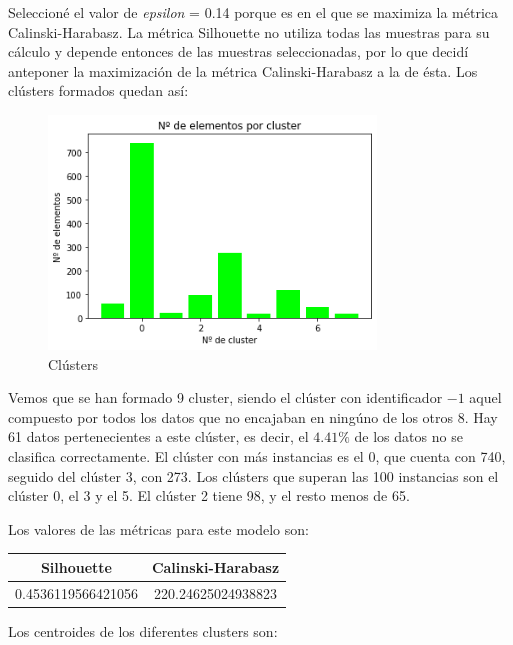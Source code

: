 \documentclass[a4]{article}
\begin{document}
Seleccioné el valor de \textit{epsilon} = 0.14 porque es en el que se maximiza la métrica Calinski-Harabasz. La métrica Silhouette no utiliza todas las muestras para su cálculo y depende entonces de las muestras seleccionadas, por lo que decidí anteponer la maximización de la métrica Calinski-Harabasz a la de ésta. Los clústers formados quedan así:

\begin{figure}[H]
  \centering
  \caption{Clústers}
  \includegraphics[width=87mm]{imagenes/c2_dbscan_clusters}
\end{figure}

Vemos que se han formado 9 cluster, siendo el clúster con identificador $-1$ aquel compuesto por todos los datos que no encajaban en ningúno de los otros 8. Hay 61 datos pertenecientes a este clúster, es decir, el $4.41\%$ de los datos no se clasifica correctamente. El clúster con más instancias es el 0, que cuenta con 740, seguido del clúster 3, con 273. Los clústers que superan las 100 instancias son el clúster 0, el 3 y el 5. El clúster 2 tiene 98, y el resto menos de 65. 

Los valores de las métricas para este modelo son:

\begin{center}
\begin{tabular}{|c|c|}
\hline
\multicolumn{1}{|c|}{\textbf{Silhouette}} & \textbf{Calinski-Harabasz}\\ \hline
  0.4536119566421056  & 220.24625024938823  \\ \hline
\end{tabular}
\end{center}

Los centroides de los diferentes clusters son:
\end{document}
